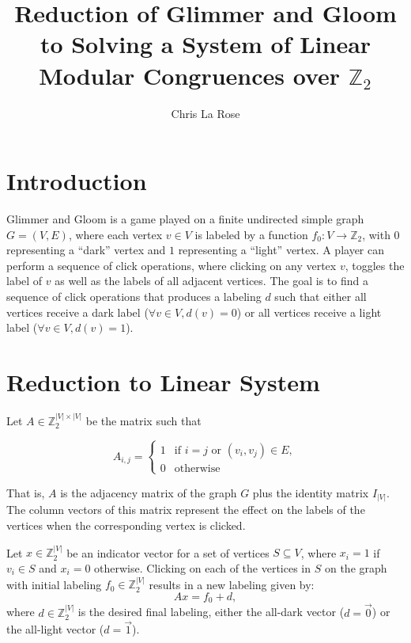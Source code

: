 \documentclass{article}
\title{Reduction of Glimmer and Gloom to Solving a System of Linear Modular Congruences over \(\mathbb{Z}_2\)}
\author{Chris La Rose}
\begin{document}
\maketitle

\section{Introduction}

Glimmer and Gloom is a game played on a finite undirected simple graph \( G = (V, E) \), where each vertex \( v \in V \) is labeled by a function \( f_0: V \to \mathbb{Z}_2 \), with \( 0 \) representing a ``dark'' vertex and \( 1 \) representing a ``light'' vertex. A player can perform a sequence of click operations, where clicking on any vertex \( v \),  toggles the label of \( v \) as well as the labels of all adjacent vertices. The goal is to find a sequence of click operations that produces a labeling \( d \) such that either all vertices receive a dark label (\(\forall v \in V, d(v) = 0 \)) or all vertices receive a light label (\( \forall v \in V, d(v) = 1 \)).

\section{Reduction to Linear System}

Let \( A \in \mathbb{Z}_2^{|V| \times |V|} \) be the matrix such that

\[
  A_{i,j} =
  \begin{cases}
        1 & \text{if } i = j \text{ or } (v_i, v_j) \in E, \\
        0 & \text{otherwise}
  \end{cases}
\]

That is, \( A \) is the adjacency matrix of the graph \( G \) plus the identity matrix \( I_{|V|} \). The column vectors of this matrix represent the effect on the labels of the vertices when the corresponding vertex is clicked.

Let  \( x \in \mathbb{Z}_2^{|V|} \) be an indicator vector for a set of vertices \( S \subseteq V \), where \( x_i = 1 \) if \( v_i \in S \) and \( x_i = 0 \) otherwise. Clicking on each of the vertices in \( S \) on the graph with initial labeling \( f_0 \in \mathbb{Z}_2^{|V|} \) results in a new labeling given by:
\[
    A x = f_0 + d,
\]
where \( d \in \mathbb{Z}_2^{|V|} \) is the desired final labeling, either the all-dark vector (\( d = \vec{0} \)) or the all-light vector (\( d = \vec{1} \)).
\end{document}
